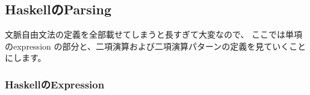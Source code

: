 \documentclass[mingoth,a4paper]{jsarticle}
\begin{document}
\subsection{HaskellのParsing}

文脈自由文法の定義を全部載せてしまうと長すぎて大変なので、
ここでは単項のexpression の部分と、二項演算および二項演算パターンの定義を見ていくことにします。

\subsubsection{HaskellのExpression}













\end{document}
